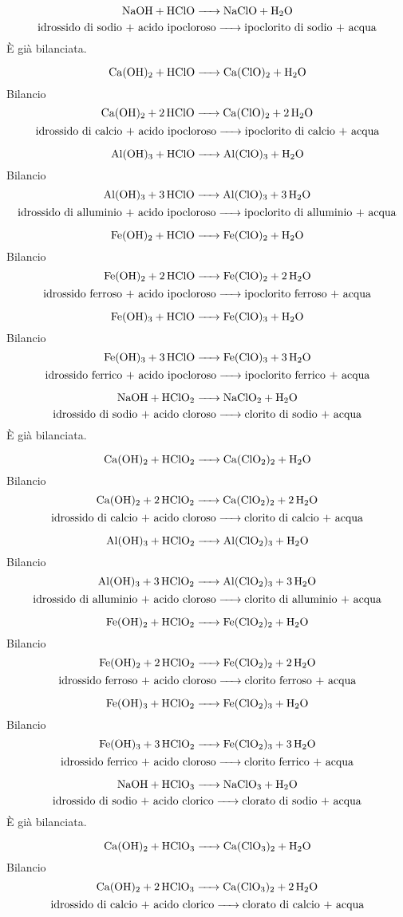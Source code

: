 $$\ce{NaOH + HClO -> NaClO + H_2O}$$
$$\text{idrossido di sodio + acido ipocloroso}\ce{->}\text{ipoclorito di sodio + acqua}$$
È già bilanciata.

$$\ce{Ca(OH)_2 + HClO -> Ca(ClO)_2 + H_2O}$$Bilancio
\newpage
$$\ce{Ca(OH)_2 + 2 HClO -> Ca(ClO)_2 + 2 H_2O}$$
$$\text{idrossido di calcio + acido ipocloroso}\ce{->}\text{ipoclorito di calcio + acqua}$$

$$\ce{Al(OH)_3 + HClO -> Al(ClO)_3 + H_2O}$$Bilancio
$$\ce{Al(OH)_3 + 3HClO -> Al(ClO)_3 + 3H_2O}$$
$$\text{idrossido di alluminio + acido ipocloroso}\ce{->}\text{ipoclorito di alluminio + acqua}$$

$$\ce{Fe(OH)_2 + HClO -> Fe(ClO)_2 + H_2O}$$Bilancio
$$\ce{Fe(OH)_2 + 2 HClO -> Fe(ClO)_2 + 2 H_2O}$$
$$\text{idrossido ferroso + acido ipocloroso}\ce{->}\text{ipoclorito ferroso + acqua}$$

$$\ce{Fe(OH)_3 + HClO -> Fe(ClO)_3 + H_2O}$$Bilancio
$$\ce{Fe(OH)_3 + 3 HClO -> Fe(ClO)_3 + 3 H_2O}$$
$$\text{idrossido ferrico + acido ipocloroso}\ce{->}\text{ipoclorito ferrico + acqua}$$

$$\ce{NaOH + HClO_2 -> NaClO_2 + H_2O}$$
$$\text{idrossido di sodio + acido cloroso}\ce{->}\text{clorito di sodio + acqua}$$
È già bilanciata.

$$\ce{Ca(OH)_2 + HClO_2 -> Ca(ClO_2)_2 + H_2O}$$Bilancio
$$\ce{Ca(OH)_2 + 2 HClO_2 -> Ca(ClO_2)_2 + 2 H_2O}$$
$$\text{idrossido di calcio + acido cloroso}\ce{->}\text{clorito di calcio + acqua}$$

$$\ce{Al(OH)_3 + HClO_2 -> Al(ClO_2)_3 + H_2O}$$Bilancio
$$\ce{Al(OH)_3 + 3HClO_2 -> Al(ClO_2)_3 + 3H_2O}$$
$$\text{idrossido di alluminio + acido cloroso}\ce{->}\text{clorito di alluminio + acqua}$$

$$\ce{Fe(OH)_2 + HClO_2 -> Fe(ClO_2)_2 + H_2O}$$Bilancio
$$\ce{Fe(OH)_2 + 2 HClO_2 -> Fe(ClO_2)_2 + 2 H_2O}$$
$$\text{idrossido ferroso + acido cloroso}\ce{->}\text{clorito ferroso + acqua}$$

$$\ce{Fe(OH)_3 + HClO_2 -> Fe(ClO_2)_3 + H_2O}$$Bilancio
$$\ce{Fe(OH)_3 + 3 HClO_2 -> Fe(ClO_2)_3 + 3 H_2O}$$
$$\text{idrossido ferrico + acido cloroso}\ce{->}\text{clorito ferrico + acqua}$$

$$\ce{NaOH + HClO_3 -> NaClO_3 + H_2O}$$
$$\text{idrossido di sodio + acido clorico}\ce{->}\text{clorato di sodio + acqua}$$
È già bilanciata.

$$\ce{Ca(OH)_2 + HClO_3 -> Ca(ClO_3)_2 + H_2O}$$Bilancio
$$\ce{Ca(OH)_2 + 2 HClO_3 -> Ca(ClO_3)_2 + 2 H_2O}$$
$$\text{idrossido di calcio + acido clorico}\ce{->}\text{clorato di calcio + acqua}$$

